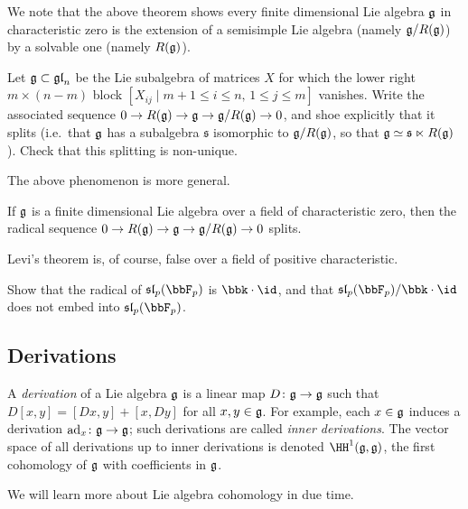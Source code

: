 We note that the above theorem shows every finite dimensional Lie algebra $\mathfrak{g}$ in
characteristic zero is the extension of a semisimple Lie algebra
(namely $\mathfrak{g}/R(\mathfrak{g})$) by a solvable one (namely $R(\mathfrak{g})$).

\begin{exercise}
    Let $\mathfrak{g}\subset \mathfrak{gl}_n$ be the Lie subalgebra of matrices $X$ for which
    the lower right $m\times (n-m)$ block $[X_{ij}\;|\; m+1 \leq i\leq n,\,1\leq
    j\leq m]$ vanishes. Write the associated sequence $0\to R(\mathfrak{g})\to \mathfrak{g} \to
    \mathfrak{g}/R(\mathfrak{g})\to 0$, and shoe explicitly that it splits (i.e.\ that
    $\mathfrak{g}$ has a subalgebra $\mathfrak{s}$ isomorphic to $\mathfrak{g}/R(\mathfrak{g})$,
    so that $\mathfrak{g} \simeq \mathfrak{s}\ltimes R(\mathfrak{g})$). Check that this
    splitting is non-unique.
\end{exercise}

The above phenomenon is more general.

\begin{theorem}
    If $\mathfrak{g}$ is a finite dimensional Lie algebra over a field of
    characteristic zero, then the radical sequence $0\to R(\mathfrak{g})\to \mathfrak{g} \to
    \mathfrak{g}/R(\mathfrak{g})\to 0$ splits.
\end{theorem}

Levi's theorem is, of course, false over a field of positive characteristic.

\begin{exercise}
    Show that the radical of $\sl_p(\bbF_p)$ is $\bbk\cdot \id$, and that
    $\sl_p(\bbF_p)/\bbk\cdot \id$ does not embed into $\sl_p(\bbF_p)$. 
\end{exercise}

\subsection{Derivations} A \emph{derivation} of a Lie algebra $\mathfrak{g}$ is a
linear map $D\colon\mathfrak{g}\to \mathfrak{g}$ such that $D[x,y]=[Dx,y]+[x,Dy]$ for all
$x,y\in \mathfrak{g}$. For
example, each $x\in \mathfrak{g}$ induces a derivation $\textnormal{ad}_x\colon \mathfrak{g}\to
\mathfrak{g}$; such derivations are called \emph{inner derivations}. The vector space
of all derivations up to inner derivations is denoted $\HH^1(\frakg, \frakg)$,
the first cohomology of $\mathfrak{g}$ with coefficients in $\mathfrak{g}$. 

We will learn more about Lie algebra cohomology in due time.


